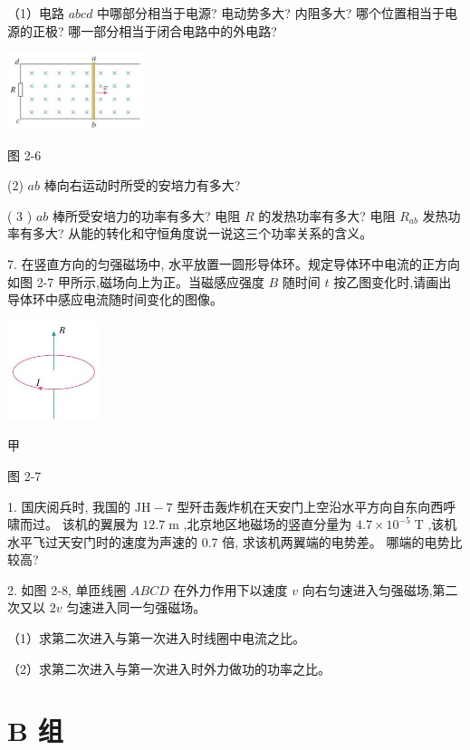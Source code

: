 \documentclass[10pt]{article}
\begin{document}
（1）电路 \({abcd}\) 中哪部分相当于电源? 电动势多大? 内阻多大? 哪个位置相当于电源的正极? 哪一部分相当于闭合电路中的外电路?

\begin{center}
\includegraphics[max width=0.3\textwidth]{images/01910e72-c5b7-7ed5-a6d4-fb3a5faefc32_51_683570.jpg}
\end{center}

图 2-6

(2) \({ab}\) 棒向右运动时所受的安培力有多大?

( 3 ) \({ab}\) 棒所受安培力的功率有多大? 电阻 \(R\) 的发热功率有多大? 电阻 \({R}_{ab}\) 发热功率有多大? 从能的转化和守恒角度说一说这三个功率关系的含义。

7. 在竖直方向的匀强磁场中, 水平放置一圆形导体环。规定导体环中电流的正方向如图 2-7 甲所示,磁场向上为正。当磁感应强度 \(B\) 随时间 \(t\) 按乙图变化时,请画出导体环中感应电流随时间变化的图像。

\begin{center}
\includegraphics[max width=0.2\textwidth]{images/01910e72-c5b7-7ed5-a6d4-fb3a5faefc32_51_539162.jpg}
\end{center}

甲

图 2-7

1. 国庆阅兵时, 我国的 \(\mathrm{{JH}} - 7\) 型歼击轰炸机在天安门上空沿水平方向自东向西呼啸而过。 该机的翼展为 \({12.7}\mathrm{\;m}\) ,北京地区地磁场的竖直分量为 \({4.7} \times {10}^{-5}\mathrm{\;T}\) ,该机水平飞过天安门时的速度为声速的 0.7 倍, 求该机两翼端的电势差。 哪端的电势比较高?

2. 如图 2-8, 单匝线圈 \({ABCD}\) 在外力作用下以速度 \(v\) 向右匀速进入匀强磁场,第二次又以 \({2v}\) 匀速进入同一匀强磁场。

（1）求第二次进入与第一次进入时线圈中电流之比。

（2）求第二次进入与第一次进入时外力做功的功率之比。

\section*{B 组}
\end{document}

